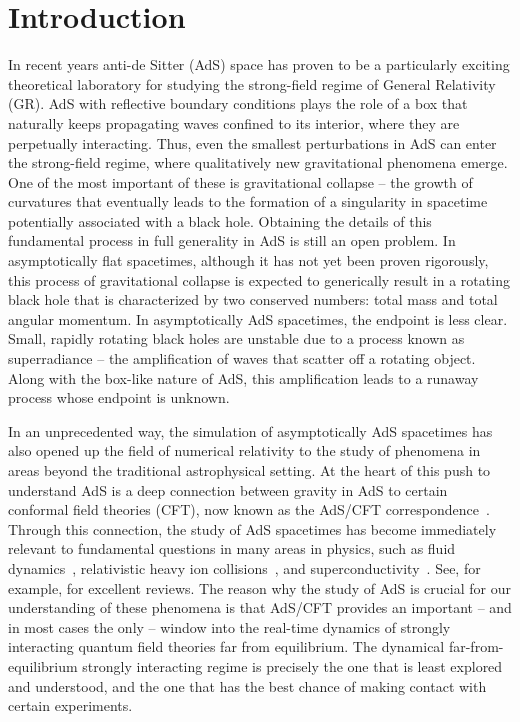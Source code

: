 \documentclass[a4paper,11pt]{article}
\numberwithin{equation}{section}
\begin{document}
\tableofcontents

\hrulefill
\vspace{10pt}



\section{Introduction}

In recent years anti-de Sitter (AdS) space has proven to be a particularly exciting theoretical laboratory for studying the strong-field regime of General Relativity (GR).
AdS with reflective boundary conditions plays the role of a box that naturally keeps propagating waves confined to its interior, where they are perpetually interacting.
Thus, even the smallest perturbations in AdS can enter the strong-field regime, where qualitatively new gravitational phenomena emerge.
One of the most important of these is gravitational collapse -- the growth of curvatures that eventually leads to the formation of a singularity in spacetime potentially associated with a black hole.
Obtaining the details of this fundamental process in full generality in AdS is still an open problem. 
In asymptotically flat spacetimes, although it has not yet been proven rigorously, this process of gravitational collapse is expected to generically result in a rotating black hole that is characterized by two conserved numbers: total mass and total angular momentum. 
In asymptotically AdS spacetimes, the endpoint is less clear.
Small, rapidly rotating black holes are unstable due to a process known as superradiance -- the amplification of waves that scatter off a rotating object. Along with the box-like nature of AdS, this amplification leads to a runaway process whose endpoint is unknown. 

In an unprecedented way, the simulation of asymptotically AdS spacetimes has also opened up the field of numerical relativity to the study of phenomena in areas beyond the traditional astrophysical setting.
At the heart of this push to understand AdS is a deep connection between gravity in AdS to certain conformal field theories (CFT), now known as the AdS/CFT correspondence~\cite{Maldacena:1997re,Gubser:1998bc,Witten:1998qj}. 
Through this connection, the study of AdS spacetimes has become immediately relevant to fundamental questions in many areas in physics, such as fluid dynamics~\cite{Baier:2007ix,Bhattacharyya:2010owp,Hubeny:2011hd}, relativistic heavy ion collisions~\cite{Chesler:2010bi,Casalderrey-Solana:2013aba,Casalderrey-Solana:2013sxa,Chesler:2015wra}, and superconductivity~\cite{Gubser:2008px,Hartnoll:2008kx,Hartnoll:2008vx}.
See, for example, \cite{CasalderreySolana:2011us,Chesler:2015lsa,Zaanen:2015oix,Hartnoll:2016apf} for excellent reviews. 
The reason why the study of AdS is crucial for our understanding of these phenomena is that AdS/CFT provides an important -- and in most cases the only -- window into the real-time dynamics of strongly interacting quantum field theories far from equilibrium. 
The dynamical far-from-equilibrium strongly interacting regime is precisely the one that is least explored and understood, and the one that has the best chance of making contact with certain experiments.
\end{document}
